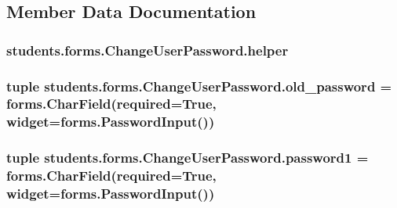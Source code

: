 \subsection{Member Data Documentation}
\hypertarget{classstudents_1_1forms_1_1_change_user_password_a3a93705cd4e07df9ffc88668c9c4197d}{
\subsubsection[{helper}]{\setlength{\rightskip}{0pt plus 5cm}students.\-forms.\-Change\-User\-Password.\-helper}}\label{classstudents_1_1forms_1_1_change_user_password_a3a93705cd4e07df9ffc88668c9c4197d}
\hypertarget{classstudents_1_1forms_1_1_change_user_password_ad1755c0b3431fb3e1921af9569292001}{
\subsubsection[{old\-\_\-password}]{\setlength{\rightskip}{0pt plus 5cm}tuple students.\-forms.\-Change\-User\-Password.\-old\-\_\-password = forms.\-Char\-Field(required=True, widget=forms.\-Password\-Input())\hspace{0.3cm}{\ttfamily [static]}}}\label{classstudents_1_1forms_1_1_change_user_password_ad1755c0b3431fb3e1921af9569292001}
\hypertarget{classstudents_1_1forms_1_1_change_user_password_a9c5c21d107754a8aa78c93bcf9d1071c}{
\subsubsection[{password1}]{\setlength{\rightskip}{0pt plus 5cm}tuple students.\-forms.\-Change\-User\-Password.\-password1 = forms.\-Char\-Field(required=True, widget=forms.\-Password\-Input())\hspace{0.3cm}{\ttfamily [static]}}}\label{classstudents_1_1forms_1_1_change_user_password_a9c5c21d107754a8aa78c93bcf9d1071c}
